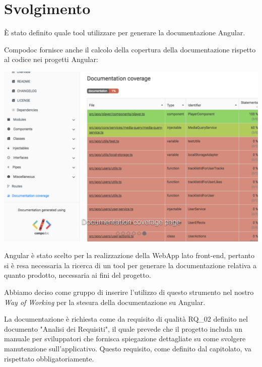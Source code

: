 \section{Svolgimento}

È stato definito quale tool utilizzare per generare la documentazione Angular.

Compodoc fornisce anche il calcolo della copertura della documentazione rispetto al codice nei progetti Angular:

\includegraphics[width = 0.9\linewidth]{img/compodoc.png}

Angular è stato scelto per la realizzazione della WebApp lato front-end, pertanto si è resa necessaria la ricerca di un tool per generare la documentazione relativa a quanto prodotto, necessaria ai fini del progetto.

Abbiamo deciso come gruppo di inserire l'utilizzo di questo strumento nel nostro {\it{Way of Working}} per la stesura della documentazione su Angular.

La documentazione è richiesta come da requisito di qualità RQ_02 definito nel documento "Analisi dei Requisiti", il quale prevede che il progetto includa un manuale per sviluppatori che fornisca spiegazione dettagliate su come svolgere manutenzione sull'applicativo. Questo requisito, come definito dal capitolato, va rispettato obbligatoriamente.